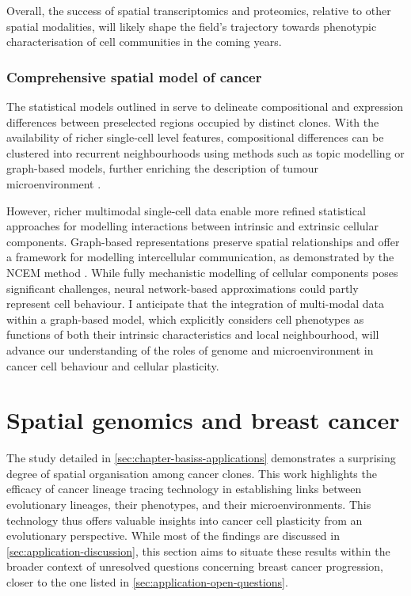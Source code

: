 Overall, the success of spatial transcriptomics and proteomics, relative to other spatial modalities, will likely shape the field's trajectory towards phenotypic characterisation of cell communities in the coming years.

\subsubsection*{Comprehensive spatial model of cancer}

The statistical models outlined in  serve to delineate compositional and expression differences between preselected regions occupied by distinct clones. With the availability of richer single-cell level features, compositional differences can be clustered into recurrent neighbourhoods using methods such as topic modelling or graph-based models, further enriching the description of tumour microenvironment \parencite{Danenberg2022-zb, Jackson2020-em, Nirmal2022-sq, Schurch2020-lp, Wang2023-bo}.

However, richer multimodal single-cell data enable more refined statistical approaches for modelling interactions between intrinsic and extrinsic cellular components. Graph-based representations preserve spatial relationships and offer a framework for modelling intercellular communication, as demonstrated by the NCEM method \parencite{Fischer2023-go}. While fully mechanistic modelling of cellular components poses significant challenges, neural network-based approximations could partly represent cell behaviour. I anticipate that the integration of multi-modal data within a graph-based model, which explicitly considers cell phenotypes as functions of both their intrinsic characteristics and local neighbourhood, will advance our understanding of the roles of genome and microenvironment in cancer cell behaviour and cellular plasticity.

\section{Spatial genomics and breast cancer}

The study detailed in \cref{sec:chapter-basiss-applications} demonstrates a surprising degree of spatial organisation among cancer clones. This work highlights the efficacy of cancer lineage tracing technology in establishing links between evolutionary lineages, their phenotypes, and their microenvironments. This technology thus offers valuable insights into cancer cell plasticity from an evolutionary perspective. While most of the findings are discussed in \cref{sec:application-discussion}, this section aims to situate these results within the broader context of unresolved questions concerning breast cancer progression, closer to the one listed in \cref{sec:application-open-questions}.

